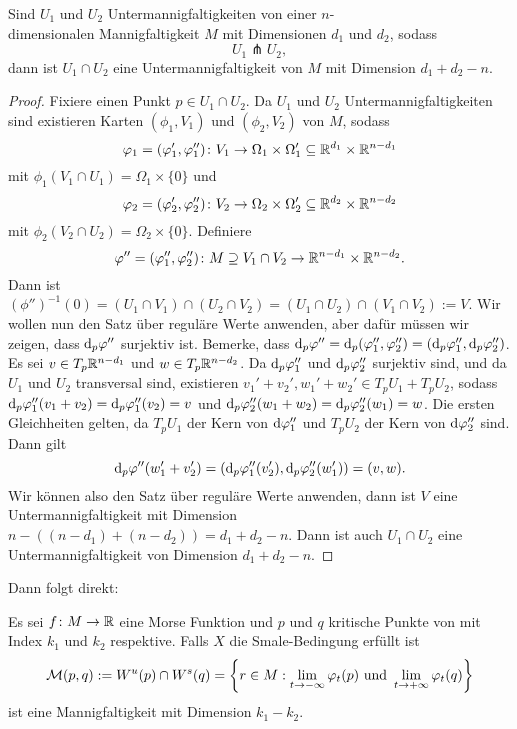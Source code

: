 \begin{prop}
    Sind $U_1$ und $U_2$ Untermannigfaltigkeiten von einer $n$-\\
    dimensionalen Mannigfaltigkeit $M$ mit 
    Dimensionen $d_1$ und $d_2$, sodass 
    \[ U_1 \pitchfork U_2 , \]
    dann ist $U_1 \cap U_2$ eine Untermannigfaltigkeit von $M$ mit Dimension $d_1 + d_2 - n$.
\end{prop}

\begin{proof}
    Fixiere einen Punkt $p \in U_1 \cap U_2$. Da $U_1$ und $U_2$ Untermannigfaltigkeiten sind existieren 
    Karten $(\phi_1, V_1)$ und $(\phi_2, V_2)$ von $M$, sodass 
    \[ \varphi_1 = (\varphi_1', \varphi_1'') \colon V_1 \to 
        \Omega_1 \times \Omega_1' \subseteq { \mathbb R }^{d_1} \times { \mathbb R }^{n - d_1} \]
    mit $\phi_1(V_1 \cap U_1) = \Omega_1 \times \{ 0 \}$ und 
    \[ \varphi_2 = (\varphi_2', \varphi_2'')\colon V_2 \to 
        \Omega_2 \times \Omega_2' \subseteq { \mathbb R }^{d_2} \times { \mathbb R }^{n - d_2} \]
    mit $\phi_2(V_2 \cap U_2) = \Omega_2 \times \{ 0 \}$. Definiere 
    \[ \varphi'' = (\varphi_1'', \varphi_2'') \colon 
        M \supseteq V_1 \cap V_2 \to { \mathbb R }^{n - d_1} \times { \mathbb R }^{n - d_2}. \]
    Dann ist 
    $(\phi'')^{-1}(0) = (U_1 \cap V_1) \cap (U_2 \cap V_2) = (U_1 \cap U_2) \cap (V_1 \cap V_2) := V$.
    Wir wollen nun den Satz über reguläre Werte anwenden, aber dafür müssen wir zeigen, dass 
    ${ \operatorname{d} }_p \varphi''$ surjektiv ist. Bemerke, dass 
    ${ \operatorname{d} }_p \varphi'' = { \operatorname{d} }_p (\varphi''_1, \varphi''_2) = ({ \operatorname{d} }_p \varphi''_1, { \operatorname{d} }_p \varphi''_2)$.
    Es sei $v \in T_p{ \mathbb R }^{n - d_1}$ und $w \in T_p{ \mathbb R }^{n - d_2}$. Da ${ \operatorname{d} }_p \varphi''_1$ und 
    ${ \operatorname{d} }_p \varphi''_2$ surjektiv sind, und da $U_1$ und $U_2$ transversal sind, 
    existieren $v_1' + v_2', w_1' + w_2' \in T_pU_1 + T_pU_2$, sodass 
    ${ \operatorname{d} }_p \varphi''_1 (v_1 + v_2) = { \operatorname{d} }_p \varphi''_1 (v_2) = v$ und 
    ${ \operatorname{d} }_p \varphi''_2 (w_1 + w_2) = { \operatorname{d} }_p \varphi''_2 (w_1) = w$.
    Die ersten Gleichheiten gelten, da $T_pU_1$ der Kern von ${ \operatorname{d} } \varphi''_1$ und 
    $T_pU_2$ der Kern von ${ \operatorname{d} } \varphi''_2$ sind. Dann gilt
    \[ { \operatorname{d} }_p \varphi'' (w_1' + v_2')  = ( { \operatorname{d} }_p \varphi''_1 (v_2'), { \operatorname{d} }_p \varphi''_2 (w_1')) = (v, w) . \]
    Wir können also den Satz über reguläre Werte anwenden, dann ist $V$ eine Untermannigfaltigkeit
    mit Dimension $n - ((n - d_1) + (n - d_2)) = d_1 + d_2 - n$. Dann ist auch $U_1 \cap U_2$
    eine Untermannigfaltigkeit von Dimension $d_1 + d_2 - n$.
\end{proof}

Dann folgt direkt:

\begin{prop}
    Es sei $f \colon M \to { \mathbb R }$ eine Morse Funktion und $p$ und $q$ kritische Punkte von mit Index $k_1$
    und $k_2$ respektive. Falls $X$ die Smale-Bedingung erfüllt ist
    \[ \mathcal{M} (p, q) := { W^u } (p) \cap { W^s } (q) = 
        \left\{ r \in M : \lim_{t \to - \infty} \varphi_t(p) \text{ und } 
        \lim_{t \to + \infty} \varphi_t(q) \right\} \]
    ist eine Mannigfaltigkeit mit Dimension $k_1 - k_2$.
\end{prop}

